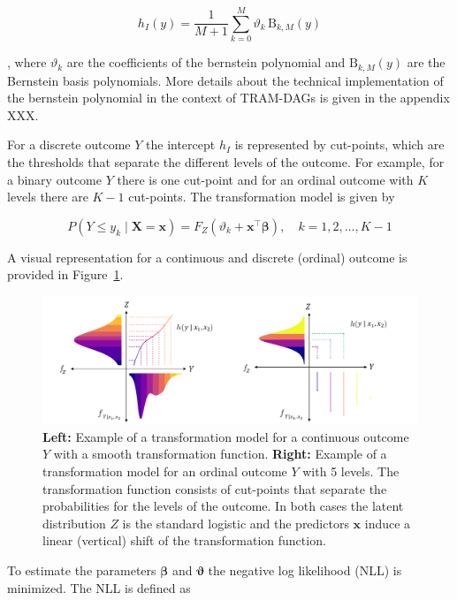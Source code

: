 \begin{equation}
h_I(y) = \frac{1}{M + 1} \sum_{k=0}^{M} \vartheta_k \, \text{B}_{k, M}(y)
\end{equation}

, where $\vartheta_k$ are the coefficients of the bernstein polynomial and $\text{B}_{k, M}(y)$ are the Bernstein basis polynomials. More details about the technical implementation of the bernstein polynomial in the context of TRAM-DAGs is given in the appendix XXX.

For a discrete outcome $Y$ the intercept $h_I$ is represented by cut-points, which are the thresholds that separate the different levels of the outcome. For example, for a binary outcome $Y$ there is one cut-point and for an ordinal outcome with $K$ levels there are $K-1$ cut-points. The transformation model is given by

\begin{equation}
P(Y \leq y_k \mid \mathbf{X} = \mathbf{x}) = F_Z(\vartheta_k + \mathbf{x}^\top \boldsymbol{\beta}), \quad k = 1, 2, \ldots, K - 1
\end{equation}


A visual representation for a continuous and discrete (ordinal) outcome is provided in Figure~\ref{fig:tram_cont_ord}.


\begin{figure}[H]
\centering
\includegraphics[width=1\textwidth]{img/tram_cont_ord.png}
\caption{\textbf{Left:} Example of a transformation model for a continuous outcome $Y$ with a smooth transformation function. \textbf{Right:} Example of a transformation model for an ordinal outcome $Y$ with 5 levels. The transformation function consists of cut-points that separate the probabilities for the levels of the outcome.
In both cases the latent distribution $Z$ is the standard logistic and the predictors $\mathbf{x}$ induce a linear (vertical) shift of the transformation function.}
\label{fig:tram_cont_ord}
\end{figure}


To estimate the parameters $\boldsymbol{\beta}$ and $\boldsymbol{\vartheta}$ the negative log likelihood (NLL) is minimized. The NLL is defined as

